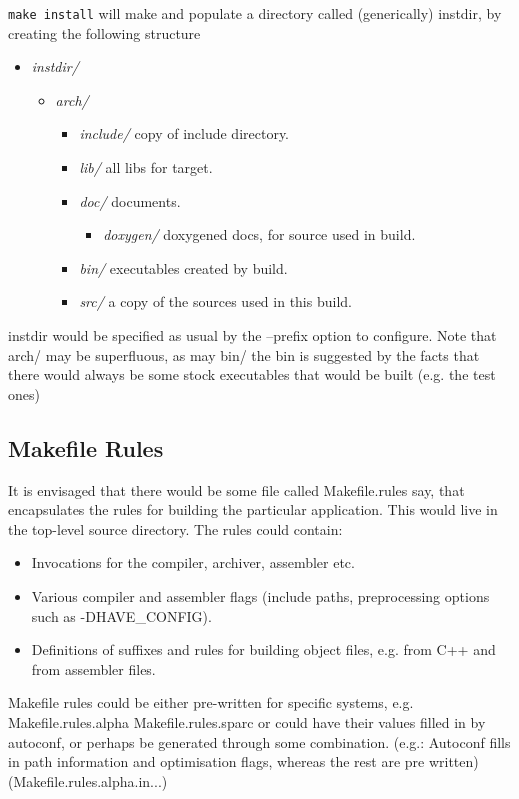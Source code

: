 \documentclass[12pt]{article}
\begin{document}
{\tt{make install}} will make and populate a directory called (generically)
instdir, by creating the following structure
\begin{itemize}
 \item \emph{instdir/}
 \begin{itemize}
  \item \emph{arch/}
  \begin{itemize}
   \item \emph{include/} copy of include directory.
   \item \emph{lib/} all libs for target.
   \item \emph{doc/} documents.
   \begin{itemize}
    \item \emph{doxygen/} doxygened docs, for source used in build.
   \end{itemize}
   \item \emph{bin/} executables created by build.
   \item \emph{src/} a copy of the sources used in this build.
  \end{itemize}
 \end{itemize}
\end{itemize}
  
instdir would be specified as usual by the --prefix option to configure.  Note
that arch/ may be superfluous, as may bin/ the bin is suggested by the facts
that there would always be some stock executables that would be built (e.g. the
test ones)


\subsection{Makefile Rules}
It is envisaged that there would be some file called Makefile.rules say, that
encapsulates the rules for building the particular application. This would
live in the top-level source directory.  The rules could contain:
\begin{itemize}
 \item Invocations for the compiler, archiver, assembler etc.
 \item Various compiler and assembler flags (include paths, preprocessing options such as -DHAVE\_CONFIG).
 \item Definitions of suffixes and rules for building object files, e.g. from C++ and from assembler files.
\end{itemize}

Makefile rules could be either pre-written for specific systems, e.g.
Makefile.rules.alpha Makefile.rules.sparc or could have their values filled in
by autoconf, or perhaps be generated through some combination. (e.g.: Autoconf
fills in path information and optimisation flags, whereas the rest are pre
written) (Makefile.rules.alpha.in...)
\end{document}
